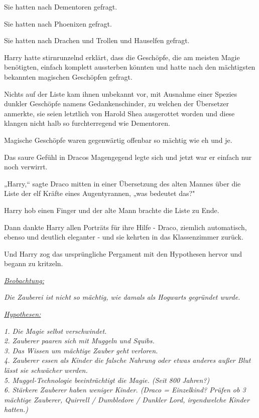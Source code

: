 {Sie hatten nach Dementoren gefragt.

Sie hatten nach Phoenixen gefragt.

Sie hatten nach Drachen und Trollen und Hauselfen gefragt.

Harry hatte stirnrunzelnd erklärt, dass die Geschöpfe, die am meisten Magie benötigten, einfach komplett aussterben könnten und hatte nach den mächtigsten bekannten magischen Geschöpfen gefragt.

Nichts auf der Liste kam ihnen unbekannt vor, mit Ausnahme einer Spezies dunkler Geschöpfe namens Gedankenschinder, zu welchen der Übersetzer anmerkte, sie seien letztlich von Harold Shea ausgerottet worden und diese klangen nicht halb so furchterregend wie Dementoren.

Magische Geschöpfe waren gegenwärtig offenbar so mächtig wie eh und je.

Das saure Gefühl in Dracos Magengegend legte sich und jetzt war er einfach nur noch verwirrt.

„Harry,“ sagte Draco mitten in einer Übersetzung des alten Mannes über die Liste der elf Kräfte eines Augentyrannen, „was bedeutet das?"

Harry hob einen Finger und der alte Mann brachte die Liste zu Ende.

Dann dankte Harry allen Porträts für ihre Hilfe - Draco, ziemlich automatisch, ebenso und deutlich eleganter - und sie kehrten in das Klassenzimmer zurück.

Und Harry zog das ursprüngliche Pergament mit den Hypothesen hervor und begann zu kritzeln.

\emph{\uline{Beobachtung:}}

\emph{Die Zauberei ist nicht so mächtig, wie damals als Hogwarts gegründet wurde.}

\emph{\uline{Hypothesen:}}

\emph{\emph{{1. Die Magie selbst verschwindet.\\ 2. Zauberer paaren sich mit Muggeln und Squibs.\\ 3. Das Wissen um mächtige Zauber geht verloren.\\ 4. Zauberer essen als Kinder die falsche Nahrung oder etwas anderes außer Blut lässt sie schwächer werden.\\ 5. Muggel-Technologie beeinträchtigt die Magie. (Seit 800 Jahren?)\\ 6. Stärkere Zauberer haben weniger Kinder. (Draco = Einzelkind? Prüfen ob 3 mächtige Zauberer, Quirrell / Dumbledore / Dunkler Lord, }}\emph{irgendwelche Kinder hatten.)}}

}
